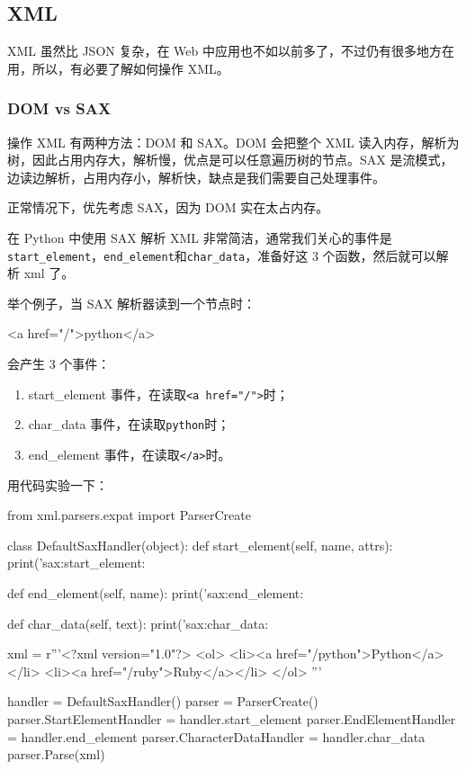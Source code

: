 \hypertarget{xml}{%
\subsection{XML}\label{xml}}

XML 虽然比 JSON 复杂，在 Web
中应用也不如以前多了，不过仍有很多地方在用，所以，有必要了解如何操作
XML。

\hypertarget{dom-vs-sax}{%
\subsubsection{DOM vs SAX}\label{dom-vs-sax}}

操作 XML 有两种方法：DOM 和 SAX。DOM 会把整个 XML
读入内存，解析为树，因此占用内存大，解析慢，优点是可以任意遍历树的节点。SAX
是流模式，边读边解析，占用内存小，解析快，缺点是我们需要自己处理事件。

正常情况下，优先考虑 SAX，因为 DOM 实在太占内存。

在 Python 中使用 SAX 解析 XML
非常简洁，通常我们关心的事件是\texttt{start\_element}，\texttt{end\_element}和\texttt{char\_data}，准备好这
3 个函数，然后就可以解析 xml 了。

举个例子，当 SAX 解析器读到一个节点时：

\begin{pythoncode}
<a href="/">python</a>
\end{pythoncode}

会产生 3 个事件：

\begin{enumerate}
\def\labelenumi{\arabic{enumi}.}
\item
  start\_element
  事件，在读取\texttt{\textless{}a\ href="/"\textgreater{}}时；
\item
  char\_data 事件，在读取\texttt{python}时；
\item
  end\_element 事件，在读取\texttt{\textless{}/a\textgreater{}}时。
\end{enumerate}

用代码实验一下：

\begin{pythoncode}
from xml.parsers.expat import ParserCreate

class DefaultSaxHandler(object):
    def start_element(self, name, attrs):
        print('sax:start_element: %

    def end_element(self, name):
        print('sax:end_element: %

    def char_data(self, text):
        print('sax:char_data: %

xml = r'''<?xml version="1.0"?>
<ol>
    <li><a href="/python">Python</a></li>
    <li><a href="/ruby">Ruby</a></li>
</ol>
'''

handler = DefaultSaxHandler()
parser = ParserCreate()
parser.StartElementHandler = handler.start_element
parser.EndElementHandler = handler.end_element
parser.CharacterDataHandler = handler.char_data
parser.Parse(xml)
\end{pythoncode}


